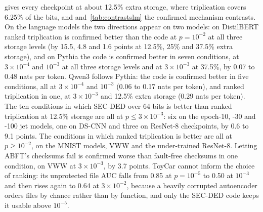  gives every checkpoint at about 12.5\% extra storage, where triplication covers 6.25\% of the bits, and  and~\ref{tab:contrastslm} the confirmed mechanism contrasts. On the language models the two directions appear on two models: on DistilBERT ranked triplication is confirmed better than the code at $p=10^{-2}$ at all three storage levels (by 15.5, 4.8 and 1.6 points at 12.5\%, 25\% and 37.5\% extra storage), and on Pythia the code is confirmed better in seven conditions, at $3\times10^{-4}$ and $10^{-3}$ at all three storage levels and at $3\times10^{-3}$ at 37.5\%, by 0.07 to 0.48 nats per token. Qwen3 follows Pythia: the code is confirmed better in five conditions, all at $3\times10^{-4}$ and $10^{-3}$ (0.06 to 0.17 nats per token), and ranked triplication in one, at $3\times10^{-3}$ and 12.5\% extra storage (0.29 nats per token). The ten conditions in which SEC-DED over 64 bits is better than ranked triplication at 12.5\% storage are all at $p\le3\times10^{-3}$: six on the epoch-10, -30 and -100 jet models, one on DS-CNN and three on ResNet-8 checkpoints, by 0.6 to 9.1 points. The conditions in which ranked triplication is better are all at $p\ge10^{-2}$, on the MNIST models, VWW and the under-trained ResNet-8. Letting ABFT's checksums fail is confirmed worse than fault-free checksums in one condition, on VWW at $3\times10^{-3}$, by 3.7 points. ToyCar cannot inform the choice of ranking: its unprotected file AUC falls from 0.85 at $p=10^{-5}$ to 0.50 at $10^{-3}$ and then rises again to 0.64 at $3\times10^{-2}$, because a heavily corrupted autoencoder orders files by chance rather than by function, and only the SEC-DED code keeps it usable above $10^{-5}$.


